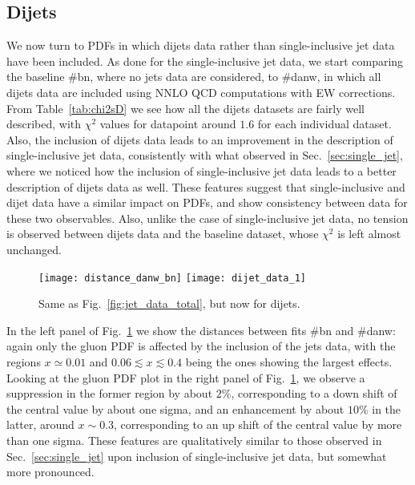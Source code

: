 \subsection{Dijets}
We now turn to PDFs in which dijets data rather than single-inclusive jet data have been included.
As done for the single-inclusive jet data, we start comparing the baseline \#bn, where no jets data are considered,
to \#danw, in which all dijets data are included using NNLO QCD computations with EW corrections.
From Table~\ref{tab:chi2sD} we see how all the dijets datasets are fairly well described, with $\chi^2$ values for datapoint
around $1.6$ for each individual dataset. Also, the inclusion of dijets data leads to an improvement in the description
of single-inclusive jet data, consistently with what observed in Sec.~\ref{sec:single_jet}, where 
we noticed how the inclusion of single-inclusive jet data leads to a better description of dijets data as well.
These features suggest that single-inclusive and dijet data have a similar impact on PDFs, and show consistency
between data for these two observables. 
%
Also, unlike the case of single-inclusive jet data, no tension is observed between dijets data and the baseline dataset,
whose $\chi^2$ is left almost unchanged.
\begin{figure}[!t]
    \centering
    \texttt{[image: distance\_danw\_bn]}
    \texttt{[image: dijet\_data\_1]}\\
    \caption{Same as Fig.~\ref{fig:jet_data_total}, but now for dijets.}
    \label{fig:dijet_data_total}
\end{figure}

%
In the left panel of Fig.~\ref{fig:dijet_data_total} we show the distances between fits \#bn and \#danw: again only
the gluon PDF is affected by the inclusion of the jets data, with the regions $x\simeq 0.01$ and $0.06\lesssim x \lesssim 0.4$
being the ones showing the largest effects.
Looking at the gluon PDF plot in the right panel of Fig.~\ref{fig:dijet_data_total}, we observe a suppression in the former region
by about $2\%$, corresponding to a down shift of the central value by about one sigma, and an enhancement by about $10\%$
in the latter, around $x\sim 0.3$, corresponding to an up shift of the central value by more than one sigma.
%
These features are qualitatively similar to those observed in Sec.~\ref{sec:single_jet} upon inclusion of single-inclusive jet
data, but somewhat more pronounced.    

